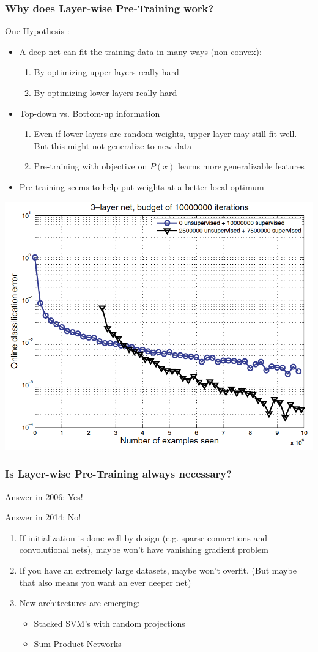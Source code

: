 \documentclass{beamer}
\newcommand{\bi}{\begin{itemize}}
\newcommand{\ei}{\end{itemize}}
\newcommand{\be}{\begin{enumerate}}
\newcommand{\ee}{\end{enumerate}}
\begin{document}
\begin{frame}
\frametitle{Why does Layer-wise Pre-Training work?}
One Hypothesis \cite{bengio09book,erhan10pretrain}:
\bi
\item A deep net can fit the training data in many ways (non-convex):
	\be
	\item By optimizing upper-layers really hard
	\item By optimizing lower-layers really hard
	\ee
\pause
\item Top-down vs. Bottom-up information
	\be
	\item Even if lower-layers are random weights, upper-layer may still fit well. But this might not generalize to new data
	\item Pre-training with objective on $P(x)$ learns more generalizable features
	\ee
\pause
\item Pre-training seems to help put weights at a better local optimum
\ei
\centerline{\includegraphics[scale=0.18]{figs/pretrain_vs_none}}
\end{frame}

\begin{frame}
\frametitle{Is Layer-wise Pre-Training always necessary?}
\pause
Answer in 2006: Yes!

\pause
Answer in 2014: No!
\be
\item If initialization is done well by design (e.g. sparse connections and convolutional nets), maybe won't have vanishing gradient problem\pause
\item If you have an extremely large datasets, maybe won't overfit. (But maybe that also means you want an ever deeper net)\pause
\item New architectures are emerging:
	\bi
	\item Stacked SVM's with random projections \cite{vinyals12}
	\item Sum-Product Networks \cite{poon11sumproduct}
	\ei
\ee 
\end{frame}
\end{document}
